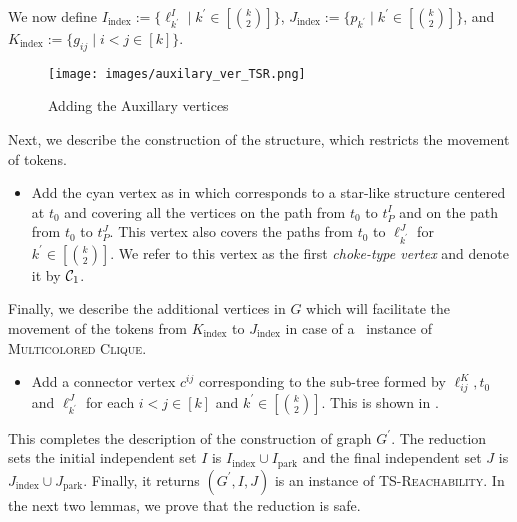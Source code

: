 We now define $I_{\text{index}}:=\{\ell^I_{k^\prime}\mid k^\prime \in [\binom{k}{2}]\}$,
$J_{\text{index}}:= \{p_{k^\prime}\mid k^\prime \in [\binom{k}{2}] \}$, and
$K_{\text{index}}:=\{g_{ij}\mid i<j \in [k]\}$.
\begin{figure}
\centering
\texttt{[image: images/auxilary\_ver\_TSR.png]}
\caption{Adding the Auxillary vertices}
\label{fig:TS-Reach-auxillary-vertices}
\vspace{-5mm}
\end{figure}
Next, we describe the construction of the
structure, which restricts the movement of tokens.
\begin{itemize}
\item Add the cyan vertex as in 
which corresponds to a  star-like structure
centered at $t_0$ and covering all the vertices on the path from
$t_0$ to $t_P^I$ and on the path from $t_0$ to $t_P^J$.
This vertex also covers the paths from $t_0$ to $\ell^J_{k^\prime}$
for $k^\prime \in [\binom{k}{2}]$.
We refer to this vertex as the first \emph{choke-type vertex}
and denote it by $\mathcal{C}_1$.
\end{itemize}
Finally, we describe the additional vertices in $G$ which
will facilitate the movement of the tokens from
$K_{\text{index}}$ to $J_{\text{index}}$
in case of a \yes\ instance of \textsc{Multicolored Clique}.
\begin{itemize}
\item Add a connector vertex $c^{ij}$ corresponding
to the sub-tree formed by $\ell^K_{ij},t_0$ and $\ell^J_{k^\prime}$
for each $i<j \in [k]$ and $k^\prime \in [\binom{k}{2}]$. This is shown in
 .
\end{itemize}

This completes the description of the construction of graph $G^\prime$.
The reduction sets the initial independent set $I$ is
$I_{\text{index}}\cup I_{\text{park}}$ and
the final independent set $J$ is
$J_{\text{index}}\cup J_{\text{park}}$.
Finally, it returns $(G^\prime, I, J)$ is an instance of \textsc{TS-Reachability}.
In the next two lemmas, we prove that the reduction is safe.


